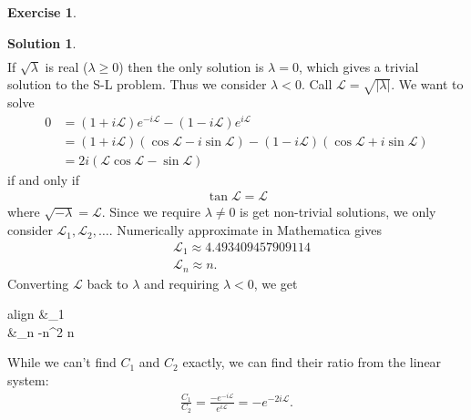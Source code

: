 \documentclass{article}
\theoremstyle{definition}
\newtheorem*{exer*}{Exercise}
\newtheorem*{sln*}{Solution}
\newcommand{\lag}{\mathcal{L}}
\begin{document}
\begin{exer*}
\begin{enumerate}
\begin{sln*}
\begin{align*}
	 	\end{align*}
	 	If $\sqrt{\lambda}$ is real ($\lambda \geq 0$) then the only solution is $\lambda = 0$, which gives a trivial solution to the S-L problem. Thus we consider $\lambda < 0$. Call $\lag = \sqrt{\vert \lambda \vert}$. We want to solve
	 	\begin{align*}
	 	0 &= (1+i\lag)e^{-i\lag} - (1-i\lag)e^{i\lag}\\
	 	&= (1+i\lag)(\cos\lag - i\sin\lag) - (1-i\lag)(\cos\lag + i\sin\lag)\\
	 	&= 2i (\lag\cos\lag - \sin\lag)
	 	\end{align*}
	 	if and only if
	 	\begin{align*}
	 	\boxed{\tan\lag = \lag}
	 	\end{align*}
	 	where $\sqrt{- \lambda } = \lag$. Since we require $\lambda\neq 0$ is get non-trivial solutions, we only consider $\lag_1,\lag_2,\dots$. Numerically approximate in Mathematica gives
	 	\begin{align*}
	 	&\lag_1 \approx 4.493409457909114\\
	 	&\lag_n \approx n.
	 	\end{align*}
	 	Converting $\lag$ back to $\lambda$ and requiring $\lambda < 0$, we get
	 	\begin{empheq}[box=\fbox]{align} 
	 	&\lambda_1 \nonumber\\
	 	&\lambda_n \approx -n^2\hspace{0.5cm} n \nonumber 
	 	\end{empheq}
	 	While we can't find $C_1$ and $C_2$ exactly, we can find their ratio from the linear system:
	 	\begin{align*}
	 	\frac{C_1}{C_2} = \frac{-e^{-i\lag}}{e^{i\lag}} = -e^{-2i\lag}.
	 	\end{align*}
	 	

\end{sln*}
\end{enumerate}
\end{exer*}
\end{document}
